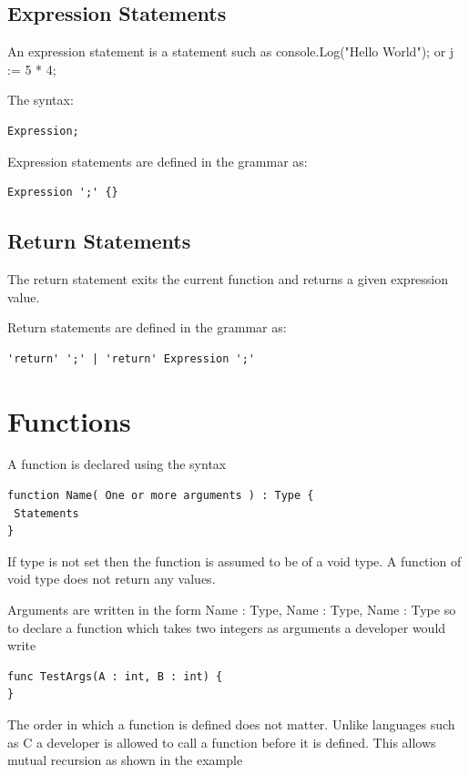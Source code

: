 \documentclass[]{final_report}
\begin{document}
\subsection{Expression Statements}

An expression statement is a statement such as console.Log("Hello World"); or j := 5 * 4;

The syntax: \begin{verbatim}Expression;\end{verbatim}

Expression statements are defined in the grammar as:
\begin{verbatim}
Expression ';' {}
\end{verbatim}

\subsection{Return Statements}

The return statement exits the current function and returns a given expression value. 

Return statements are defined in the grammar as:
\begin{verbatim}
'return' ';' | 'return' Expression ';'
\end{verbatim}

\section{Functions}

A function is declared using the syntax

\begin{verbatim}
function Name( One or more arguments ) : Type {
 Statements
}
\end{verbatim}

If type is not set then the function is assumed to be of a void type. A function of void type does not return any values.

Arguments are written in the form Name : Type, Name : Type, Name : Type so to declare a function which takes two integers as arguments a developer would write

\begin{verbatim}
func TestArgs(A : int, B : int) {
}
\end{verbatim}

The order in which a function is defined does not matter. Unlike languages such as C a developer is allowed to call a function before it is defined. This allows mutual recursion as shown in the example
\end{document}
